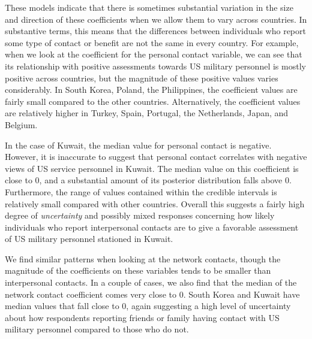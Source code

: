 These models indicate that there is sometimes substantial variation in the size and direction of these coefficients when we allow them to vary across countries. In substantive terms, this means that the differences between individuals who report some type of contact or benefit are not the same in every country. For example, when we look at the coefficient for the personal contact variable, we can see that its relationship with positive assessments towards US military personnel is mostly positive across countries, but the magnitude of these positive values varies considerably. In South Korea, Poland, the Philippines, the coefficient values are fairly small compared to the other countries. Alternatively, the coefficient values are relatively higher in Turkey, Spain, Portugal, the Netherlands, Japan, and Belgium. 

In the case of Kuwait, the median value for personal contact is negative. However, it is inaccurate to suggest that personal contact correlates with negative views of US service personnel in Kuwait. The median value on this coefficient is close to 0, and a substantial amount of its posterior distribution falls above 0. Furthermore, the range of values contained within the credible intervals is relatively small compared with other countries. Overall this suggests a fairly high degree of \textit{uncertainty} and possibly mixed responses concerning how likely individuals who report interpersonal contacts are to give a favorable assessment of US military personnel stationed in Kuwait.

We find similar patterns when looking at the network contacts, though the magnitude of the coefficients on these variables tends to be smaller than interpersonal contacts. In a couple of cases, we also find that the median of the network contact coefficient comes very close to 0. South Korea and Kuwait have median values that fall close to 0, again suggesting a high level of uncertainty about how respondents reporting friends or family having contact with US military personnel compared to those who do not.  

